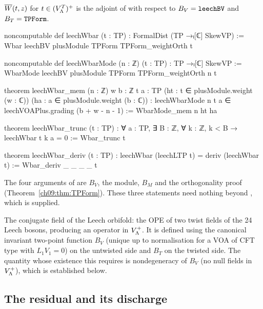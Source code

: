 \begin{definition}\label{ch09:def:leechWbar}
$\overline{W}(t,z)$ for $t\in(V_{\Lambda}^{T})^{+}$ is the adjoint of  with respect to
$B_V=\lean{leechBV}$ and $B_T=\lean{TPForm}$.
\end{definition}
\begin{leancode}
noncomputable def leechWbar (t : TP) : FormalDist (TP →ₗ[ℂ] SkewVP) :=
  Wbar leechBV plusModule TPForm TPForm_weightOrth t

noncomputable def leechWbarMode (n : ℤ) (t : TP) : TP →ₗ[ℂ] SkewVP :=
  WbarMode leechBV plusModule TPForm TPForm_weightOrth n t

theorem leechWbar_mem (n : ℤ) {w b : ℤ} {t a : TP} (ht : t ∈ plusModule.weight (w : ℂ))
    (ha : a ∈ plusModule.weight (b : ℂ)) :
    leechWbarMode n t a ∈ leechVOAPlus.grading (b + w - n - 1) :=
  WbarMode_mem n ht ha

theorem leechWbar_trunc (t : TP) :
    ∀ a : TP, ∃ B : ℤ, ∀ k : ℤ, k < B → leechWbar t k a = 0 :=
  Wbar_trunc t

theorem leechWbar_deriv (t : TP) : leechWbar (leechLTP t) = deriv (leechWbar t) :=
  Wbar_deriv _ _ _ _ t
\end{leancode}
\begin{dictionary}
The four arguments of  are $B_V$, the module, $B_M$ and the orthogonality proof
 (Theorem~\ref{ch09:thm:TPForm}). These three statements need nothing
beyond , which is supplied.
\end{dictionary}

\begin{physics}
The conjugate field of the Leech orbifold: the OPE of two twist fields of the 24 Leech bosons, producing an operator in $V_{\Lambda}^{+}$. It is defined using the canonical invariant two-point function $B_V$ (unique up to normalisation for a VOA of CFT type with $L_1V_1=0$) on the untwisted side and $B_T$ on the twisted side. The quantity whose existence this requires is nondegeneracy of $B_V$ (no null fields in $V_{\Lambda}^{+}$), which is established below.
\end{physics}

\subsection{The residual \texorpdfstring{}{hnd} and its discharge}

